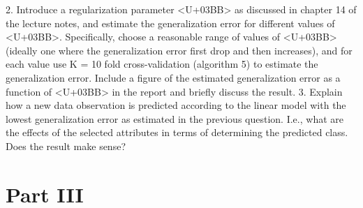 \documentclass{report}
\begin{document}
2. Introduce a regularization parameter <U+03BB> as discussed in chapter 14 of the lecture
notes, and estimate the generalization error for different values of <U+03BB>. Specifically, choose a reasonable range of values of <U+03BB> (ideally one where the generalization error first drop and then increases), and for each value use K = 10
fold cross-validation (algorithm 5) to estimate the generalization error.
Include a figure of the estimated generalization error as a function of <U+03BB> in the
report and briefly discuss the result.
3. Explain how a new data observation is predicted according to the linear model
with the lowest generalization error as estimated in the previous question.
I.e., what are the effects of the selected attributes in terms of determining the
predicted class. Does the result make sense?


\chapter{Part III}
\end{document}
